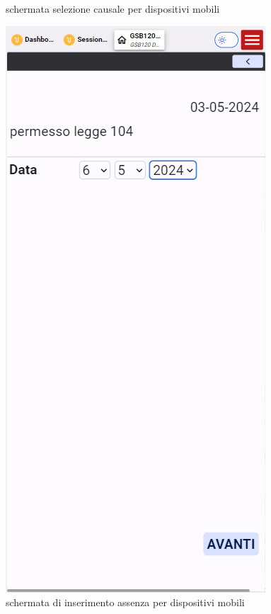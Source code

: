 \documentclass[target=bach,aauheader=,style=]{thud}
\begin{document}
\begin{figure}[H]
\begin{minipage}{0.25\textwidth}
        \caption{schermata selezione causale per dispositivi mobili}
    \end{minipage}
    \hfill
    \begin{minipage}{0.25\textwidth}
        \centering
        \includegraphics[width=\linewidth]{screenshot/Mobile GSA084 step1.png}
        \caption{schermata di inserimento assenza per dispositivi mobili}
    \end{minipage}
\end{figure}
\end{document}
